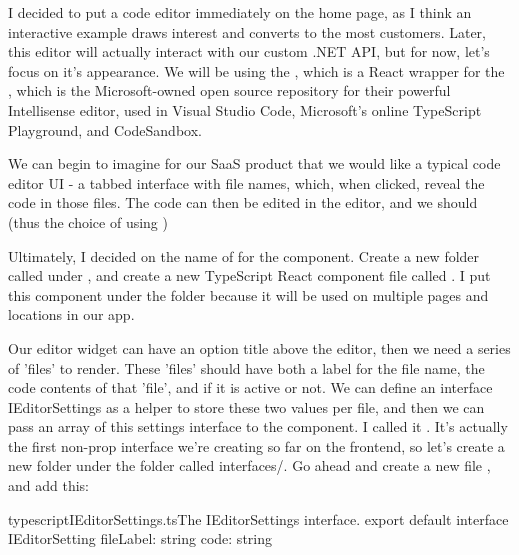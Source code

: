 \documentclass[paper=6in:9in,pagesize=pdftex,headinclude=on,footinclude=on,12pt,twoside]{scrbook}
\makeatletter
\newcommand{\at}{\makeatletter @\makeatother}
\makeatother
\begin{document}
I decided to put a code editor immediately on the home page, as I think an interactive example draws interest and converts to the most customers. Later, this editor will actually interact with our custom .NET API, but for now, let's focus on it's appearance. We will be using the \codeword{\at monaco-editor/react}, which is a React wrapper for the , which is the Microsoft-owned open source repository for their powerful Intellisense editor, used in Visual Studio Code, Microsoft's online TypeScript Playground, and CodeSandbox. 


We can begin to imagine for our SaaS product that we would like a typical code editor UI - a tabbed interface with file names, which, when clicked, reveal the code in those files. The code can then be edited in the editor, and we should (thus the choice of using )


Ultimately, I decided on the name of  for the component. Create a new folder called  under , and create a new TypeScript React component file called . I put this component under the  folder because it will be used on multiple pages and locations in our app.


Our editor widget can have an option title above the editor, then we need a series of 'files' to render. These 'files' should have both a label for the file name, the code contents of that 'file', and if it is active or not. We can define an interface IEditorSettings as a helper to store these two values per file, and then we can pass an array of this settings interface to the  component. I called it . It's actually the first non-prop interface we're creating so far on the frontend, so let's create a new folder under the  folder called {interfaces/}. Go ahead and create a new file , and add this:

\begin{codeInput}{typescript}{IEditorSettings.ts}{The IEditorSettings interface.}
export default interface IEditorSetting {
  fileLabel: string
  code: string
}  
\end{codeInput}
\end{document}
